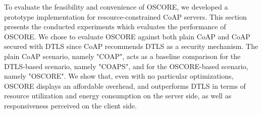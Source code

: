 {To evaluate the feasibility and convenience of OSCORE, we developed a prototype implementation for resource-constrained CoAP servers. This section presents the conducted experiments which evaluates the performance of OSCORE. We chose to evaluate OSCORE against both plain CoAP and CoAP secured with DTLS since CoAP recommends DTLS as a security mechanism. The plain CoAP scenario, namely "COAP", acts as a baseline comparison for the DTLS-based scenario, namely "COAPS", and for the OSCORE-based scenario, namely "OSCORE". We show that, even with no particular optimizations, OSCORE displays an affordable overhead, and outperforms DTLS in terms of resource utilization and energy consumption on the server side, as well as responsiveness perceived on the client side.

\begin{figure}[!htbp]
\centering
\end{figure}}
